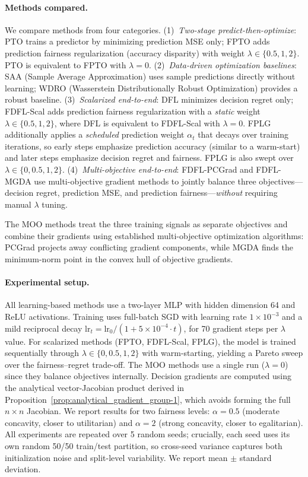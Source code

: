 \documentclass[ijoc,sglanonrev]{informs4}
\begin{document}
\paragraph{Methods compared.}
We compare methods from four categories. (1)~\textit{Two-stage predict-then-optimize}: PTO trains a predictor by minimizing prediction MSE only; FPTO adds prediction fairness regularization (accuracy disparity) with weight $\lambda \in \{0.5, 1, 2\}$. PTO is equivalent to FPTO with $\lambda = 0$. (2)~\textit{Data-driven optimization baselines}: SAA (Sample Average Approximation) uses sample predictions directly without learning; WDRO (Wasserstein Distributionally Robust Optimization) provides a robust baseline. (3)~\textit{Scalarized end-to-end}: DFL minimizes decision regret only; FDFL-Scal adds prediction fairness regularization with a \emph{static} weight $\lambda \in \{0.5, 1, 2\}$, where DFL is equivalent to FDFL-Scal with $\lambda = 0$. FPLG additionally applies a \emph{scheduled} prediction weight $\alpha_t$ that decays over training iterations, so early steps emphasize prediction accuracy (similar to a warm-start) and later steps emphasize decision regret and fairness. FPLG is also swept over $\lambda \in \{0, 0.5, 1, 2\}$. (4)~\textit{Multi-objective end-to-end}: FDFL-PCGrad and FDFL-MGDA use multi-objective gradient methods to jointly balance three objectives---decision regret, prediction MSE, and prediction fairness---\emph{without} requiring manual $\lambda$ tuning.

The MOO methods treat the three training signals as separate objectives and combine their gradients using established multi-objective optimization algorithms: PCGrad projects away conflicting gradient components, while MGDA finds the minimum-norm point in the convex hull of objective gradients.

\paragraph{Experimental setup.}
All learning-based methods use a two-layer MLP with hidden dimension 64 and ReLU activations. Training uses full-batch SGD with learning rate $1 \times 10^{-3}$ and a mild reciprocal decay $\mathrm{lr}_t = \mathrm{lr}_0 / (1 + 5 \times 10^{-4} \cdot t)$, for 70 gradient steps per $\lambda$ value. For scalarized methods (FPTO, FDFL-Scal, FPLG), the model is trained sequentially through $\lambda \in \{0, 0.5, 1, 2\}$ with warm-starting, yielding a Pareto sweep over the fairness--regret trade-off. The MOO methods use a single run ($\lambda = 0$) since they balance objectives internally. Decision gradients are computed using the analytical vector-Jacobian product derived in Proposition~\ref{prop:analytical_gradient_group-1}, which avoids forming the full $n \times n$ Jacobian. We report results for two fairness levels: $\alpha = 0.5$ (moderate concavity, closer to utilitarian) and $\alpha = 2$ (strong concavity, closer to egalitarian). All experiments are repeated over 5 random seeds; crucially, each seed uses its own random 50/50 train/test partition, so cross-seed variance captures both initialization noise and split-level variability. We report mean $\pm$ standard deviation.
\end{document}
